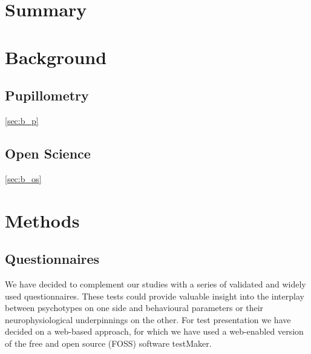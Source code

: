 
\chapter{Summary}	
\readme
\chapter{Background}
    \section{Pupillometry}\ref{sec:b_p}
    \section{Open Science}\ref{sec:b_os}
\chapter{Methods}
    \section{Questionnaires}
	We have decided to complement our studies with a series of validated and widely used questionnaires.
	These tests could provide valuable insight into the interplay between psychotypes on one side and behavioural parameters or their neurophysiological underpinnings on the other.
	For test presentation we have decided on a web-based approach, for which we have used a web-enabled version of the free and open source (FOSS) software testMaker\cite{testmaker}.
	
